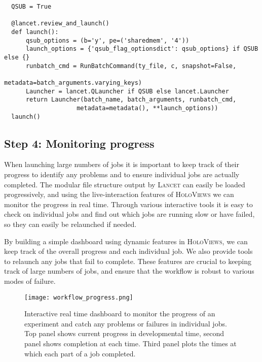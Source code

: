 \begin{minipage}{\linewidth}
\begin{lstlisting}
  QSUB = True

  @lancet.review_and_launch()
  def launch():
      qsub_options = (b='y', pe=('sharedmem', '4'))
      launch_options = {'qsub_flag_optionsdict': qsub_options} if QSUB else {}
      runbatch_cmd = RunBatchCommand(ty_file, c, snapshot=False,
                                     metadata=batch_arguments.varying_keys)
      Launcher = lancet.QLauncher if QSUB else lancet.Launcher
      return Launcher(batch_name, batch_arguments, runbatch_cmd,
                    metadata=metadata(), **launch_options))
  launch()
\end{lstlisting}
\end{minipage}

\subsection{Step 4: Monitoring progress}

When launching large numbers of jobs it is important to keep track of
their progress to identify any problems and to ensure individual jobs
are actually completed. The modular file structure output by
\textsc{Lancet} can easily be loaded progressively, and using the
live-interaction features of \textsc{HoloViews} we can monitor the
progress in real time. Through various interactive tools it is easy to
check on individual jobs and find out which jobs are running slow or
have failed, so they can easily be relaunched if needed.

By building a simple dashboard using dynamic features in
\textsc{HoloViews}, we can keep track of the overall progress and each
individual job.  We also provide tools to relaunch any jobs that fail
to complete. These features are crucial to keeping track of large
numbers of jobs, and ensure that the workflow is robust to various
modes of failure.

\begin{figure}
	\centering
        \texttt{[image: workflow\_progress.png]}
	    \caption[Interactive dashboard to monitor workflow
          progress.]{Interactive real time dashboard to monitor the
          progress of an experiment and catch any problems or failures
          in individual jobs. Top panel shows current progress in
          developmental time, second panel shows completion at each
          time. Third panel plots the times at which each part of a
          job completed.}
	\label{workflow_progress}
\end{figure}



